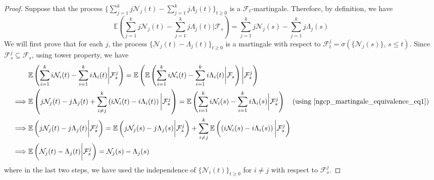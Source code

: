 \documentclass[11pt,oneside,reqno]{amsart}
\theoremstyle{definition}
\theoremstyle{remarkstyle}
\begin{document}
\begin{proof}
    Suppose that the process $\{\sum_{j=1}^{k}j\mathcal{N}_j(t)-\sum_{j=1}^{k}j\Lambda_j(t)\}_{t\ge 0}$ is a $\mathcal{F}_t$-martingale. Therefore, by definition, we have
    \begin{equation}
        \mathbb{E}\left(\sum_{j=1}^{k}j\mathcal{N}_j(t)-\sum_{j=1}^{k}j\Lambda_j(t)\bigg|\mathcal{F}_s\right)=\sum_{j=1}^{k}j\mathcal{N}_j(s)-\sum_{j=1}^{k}j\Lambda_j(s)\label{ngcp_martingale_equivalence_eq1}
    \end{equation}
    We will first prove that for each $j$, the process $\{\mathcal{N}_j(t)-\Lambda_j(t)\}_{t\ge 0}$ is a martingale with respect to $\mathcal{F}_t^j=\sigma(\{\mathcal{N}_j(s)\},\,s\le t)$. Since $\mathcal{F}_s^j\subseteq\mathcal{F}_s$, using tower property, we have
    \begin{align}
        &\mathbb{E}\left(\sum_{i=1}^{k}i\mathcal{N}_i(t)-\sum_{i=1}^{k}i\Lambda_i(t)\bigg|\mathcal{F}_s^j\right)=\mathbb{E}\left(\mathbb{E}\left(\sum_{i=1}^{k}i\mathcal{N}_i(t)-\sum_{i=1}^{k}i\Lambda_i(t)\bigg|\mathcal{F}_s\right)\bigg|\mathcal{F}_s^j\right)\nonumber\\
        \implies&\mathbb{E}\left(j\mathcal{N}_j(t)-j\Lambda_j(t)+\sum_{i\neq j}^k\left(i\mathcal{N}_i(t)-i\Lambda_i(t)\right)\bigg|\mathcal{F}_s^j\right)=\mathbb{E}\left(\sum_{i=1}^{k}i\mathcal{N}_i(s)-\sum_{i=1}^{k}i\Lambda_i(s)\bigg|\mathcal{F}_s^j\right)\quad(\text{using }\eqref{ngcp_martingale_equivalence_eq1})\nonumber\\
        \implies&\mathbb{E}\left(j\mathcal{N}_j(t)-j\Lambda_j(t)\bigg|\mathcal{F}_s^j\right)=\mathbb{E}\left(j\mathcal{N}_j(s)-j\Lambda_j(s)\bigg|\mathcal{F}_s^j\right)+\sum_{i\neq j}^k\mathbb{E}\left(\left(i\mathcal{N}_i(s)-i\Lambda_i(s)\right)\bigg|\mathcal{F}_s^j\right)\nonumber\\
        \implies&\mathbb{E}\left(\mathcal{N}_j(t)-\Lambda_j(t)\bigg|\mathcal{F}_s^j\right)=\mathcal{N}_j(s)-\Lambda_j(s)\label{ngcp_martingale_equivalence_eq2}
    \end{align}
    where in the last two steps, we have used the independence of $\{\mathcal{N}_i(t)\}_{t\ge 0}$ for $i\neq j$ with respect to $\mathcal{F}_s^j$. 

\end{proof}
\end{document}
